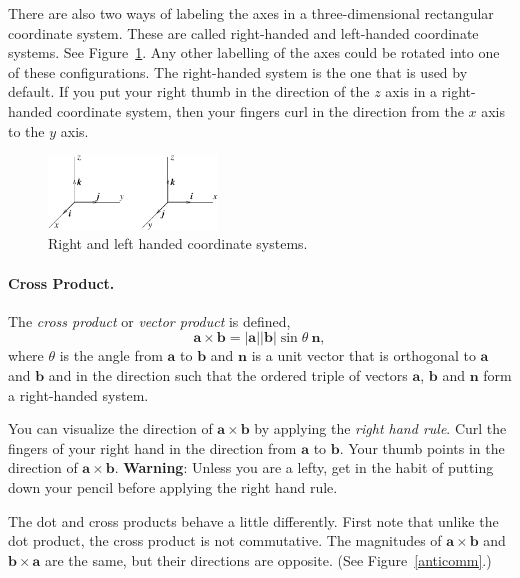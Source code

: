 There are also two ways of labeling the axes in a three-dimensional
rectangular coordinate system.  These are called right-handed and 
left-handed coordinate systems.  See Figure~\ref{rlhand}. 
Any other labelling of the axes could be rotated into one of these 
configurations.  The right-handed system is the one that is used by
default.  If you put your right thumb in the 
direction of the $z$ axis in a right-handed coordinate system, then your
fingers curl in the direction from the $x$ axis to the $y$ axis.

\begin{figure}[htb!]
\begin{center}
  \includegraphics[width=0.4\textwidth]{algebra/vectors/rlhand}
\end{center}
\caption{Right and left handed coordinate systems.}
\label{rlhand}
\end{figure}







\paragraph{Cross Product.}
The \textit{cross product} or \textit{vector product} is defined,
\[
\mathbf{a} \times \mathbf{b} = | \mathbf{a} | | \mathbf{b} | \sin \theta \ 
\mathbf{n},
\]
where $\theta$ is the angle from $\mathbf{a}$ to $\mathbf{b}$ and 
$\mathbf{n}$ is a unit vector that is orthogonal to $\mathbf{a}$
and $\mathbf{b}$ and in the direction such that the ordered triple of
vectors $\mathbf{a}$, 
$\mathbf{b}$ and $\mathbf{n}$ form a right-handed system.

You can visualize the direction of $\mathbf{a} \times \mathbf{b}$ by applying
the \textit{right hand rule}.  Curl the fingers of your right hand in 
the direction from $\mathbf{a}$ to $\mathbf{b}$.  Your thumb points in the direction
of $\mathbf{a} \times \mathbf{b}$.  \textbf{Warning}:  Unless you are a lefty,
get in the habit of putting down your pencil before applying the right
hand rule.





The dot and cross products behave a little differently.
First note that unlike the dot product, the cross product is not 
commutative.  The magnitudes of $\mathbf{a} \times \mathbf{b}$
and $\mathbf{b} \times \mathbf{a}$ are the same, but their directions are opposite.
(See Figure~\ref{anticomm}.)


